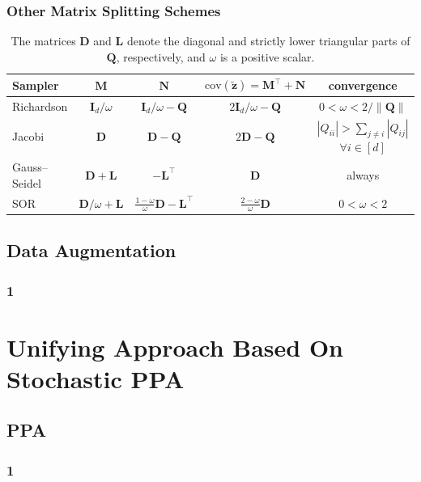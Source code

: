 \documentclass[aspectratio=169]{beamer}
\newcommand{\B}[1]{\mathbf{#1}} %
\newcommand{\nr}[1]{\left\|#1\right\|} %
\begin{document}
\begin{frame}
\frametitle{Other Matrix Splitting Schemes}
\begin{table}
{\footnotesize
\caption{The matrices $\B{D}$ and $\B{L}$ denote the diagonal and strictly lower triangular parts of $\B{Q}$, respectively, and $\omega$ is a positive scalar.}
\begin{center}
{\renewcommand{\arraystretch}{1.5}
\begin{tabular}{|l|c|c|c|c|} 
    \hline
    \textbf{Sampler} & $\B{M}$ & $\B{N}$ & $\mathrm{cov}(\tilde{\B{z}}) = \B{M}^{\top} + \B{N}$ & convergence\\
    \hline 
    Richardson & $\B{I}_d/\omega$ & $\B{I}_d/\omega - \B{Q}$ & $2\B{I}_d/\omega - \B{Q}$ & $0 < \omega < 2/\nr{\B{Q}}$\\ 
    Jacobi & $\B{D}$ & $\B{D} - \B{Q}$ & $2\B{D} - \B{Q}$ & $|Q_{ii}| > \sum_{j\neq i}|Q_{ij}|$ $\forall i \in [d]$\\
    Gauss--Seidel & $\B{D} + \B{L}$ & $-\B{L}^{\top}$ & $\B{D}$ & always\\
    SOR & $\B{D}/\omega + \B{L}$ & $\frac{1-\omega}{\omega}\B{D} - \B{L}^{\top}$ & $\frac{2-\omega}{\omega}\B{D}$ & $0 < \omega < 2$\\[1em]
    \hline
\end{tabular}}
\end{center}
}
\end{table}
\end{frame}

\subsection{Data Augmentation}
\begin{frame}
\frametitle{1}
\end{frame}

\section{Unifying Approach Based On Stochastic PPA}
\subsection{PPA}
\begin{frame}
\frametitle{1}
\end{frame}
\end{document}
